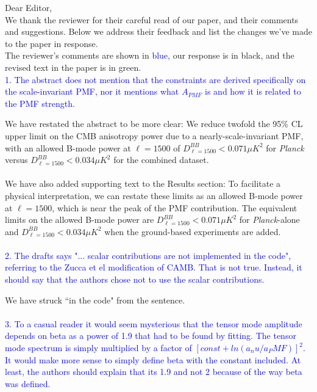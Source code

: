 \documentclass{article}
\newcommand{\planck}{{\sl Planck}}
\newcommand{\reviewer}[1]{\textcolor{Blue}{#1}}
\newcommand{\diff}[1]{\textcolor{PineGreen}{#1}}
\begin{document}
Dear Editor,\\

We thank the reviewer for their  careful read of our paper, and their comments and suggestions. Below we address their feedback and list the changes we've made to the paper in response.\\


The reviewer's comments are shown in \reviewer{blue,} our response is in black, and the revised text in the paper is in \diff{green}. \\

\reviewer{1. The abstract does not mention that the constraints are derived specifically on the scale-invariant PMF, nor it mentions what $A_{PMF}$ is and how it is related to the PMF strength.}

We have restated the abstract to be more clear:
\diff{We reduce twofold the 95\% CL upper limit on the CMB anisotropy power due to a nearly-scale-invariant PMF, with an allowed B-mode power at $\ell=1500$ of $D_{\ell=1500}^{BB} < 0.071 \mu K^2$ for \planck{} versus $D_{\ell=1500}^{BB} < 0.034 \mu K^2$ for the combined dataset. }
\\\\
We have also added supporting text to the Results section:
\diff{To facilitate a physical interpretation, we can restate these limits as an allowed B-mode power  at $\ell=1500$, which is near the peak of the PMF contribution. 
The equivalent limits on the allowed B-mode power are $D_{\ell=1500}^{BB} < 0.071 \mu K^2$ for \planck{}-alone and $D_{\ell=1500}^{BB} < 0.034 \mu K^2$ when the ground-based experiments are added. }
\\\\
\reviewer{2. The drafts says "... scalar contributions are not implemented in the code", referring to the Zucca et el modification of CAMB. That is not true. Instead, it should say that the authors chose not to use the scalar contributions.}

We have struck ``in the code" from the sentence.
\\\\
\reviewer{3. To a casual reader it would seem mysterious that the tensor mode amplitude depends on beta as a power of 1.9 that had to be found by fitting. The tensor mode spectrum is simply multiplied by a factor of $[const+ln(a_nu/a_PMF)]^2$. It would make more sense to simply define beta with the constant included. At least, the authors should explain that its 1.9 and not 2 because of the way beta was defined.}
\\\\
\end{document}
